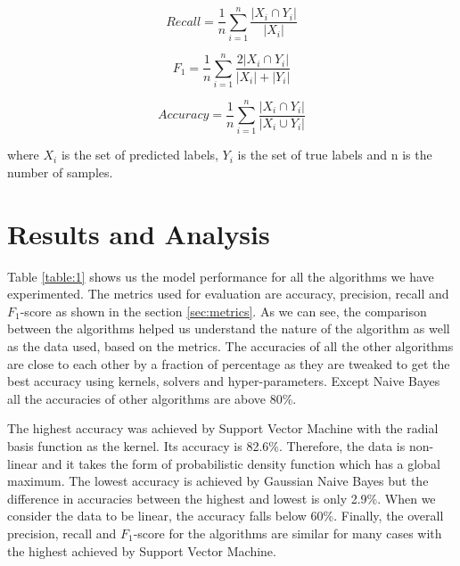 \documentclass[conference]{IEEEtran}
\begin{document}
\begin{equation}
Recall = \frac{1}{n}\sum\limits_{i=1}^{n} \frac{|X_i \cap Y_i|}{|X_i|}
\end{equation}

\begin{equation}
F_1 = \frac{1}{n}\sum\limits_{i=1}^{n} \frac{2|X_i \cap Y_i|}{|X_i| + |Y_i|}
\end{equation}

\begin{equation}
Accuracy = \frac{1}{n}\sum\limits_{i=1}^{n} \frac{|X_i \cap Y_i|}{|X_i \cup Y_i|}
\end{equation}

where $X_i$ is the set of predicted labels, $Y_i$ is the set of true labels and n is the number of samples.

\section{Results and Analysis}
Table \ref{table:1} shows us the model performance for all the algorithms we have experimented. The metrics used for evaluation are accuracy, precision, recall and $F_1$-score as shown in the section \ref{sec:metrics}. As we can see, the comparison between the algorithms helped us understand the nature of the algorithm as well as the data used, based on the metrics. The accuracies of all the other algorithms are close to each other by a fraction of percentage as they are tweaked to get the best accuracy using kernels, solvers and hyper-parameters. Except Naive Bayes all the accuracies of other algorithms are above 80\%.
\par
The highest accuracy was achieved by Support Vector Machine with the radial basis function as the kernel. Its accuracy is 82.6\%. Therefore, the data is non-linear and it takes the form of probabilistic density function which has a global maximum. The lowest accuracy is achieved by Gaussian Naive Bayes but the difference in accuracies between the highest and lowest is only 2.9\%. When we consider the data to be linear, the accuracy falls below 60\%. Finally, the overall precision, recall and $F_1$-score for the algorithms are similar for many cases with the highest achieved by Support Vector Machine.
\par
\end{document}
